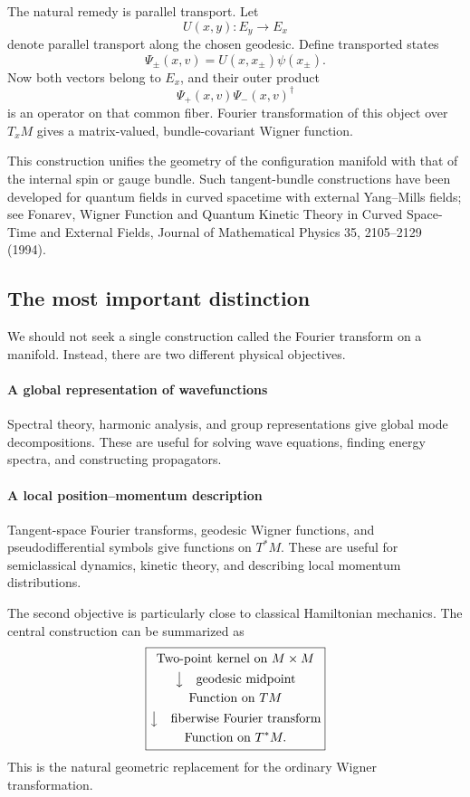 The natural remedy is parallel transport.
Let
\[
U(x,y):E_y\longrightarrow E_x
\]
denote parallel transport along the chosen geodesic.
Define transported states
\[
\Psi_\pm(x,v)=U(x,x_\pm)\psi(x_\pm).
\]
Now both vectors belong to \(E_x\), and their outer product
\[
\Psi_+(x,v)\Psi_-(x,v)^\dagger
\]
is an operator on that common fiber.
Fourier transformation of this object over \(T_xM\) gives a matrix-valued,
bundle-covariant Wigner function.

This construction unifies the geometry of the configuration manifold with that
of the internal spin or gauge bundle.
Such tangent-bundle constructions have been developed for quantum fields in
curved spacetime with external Yang–Mills fields; see Fonarev, Wigner Function
and Quantum Kinetic Theory in Curved Space-Time and External Fields, Journal of
Mathematical Physics 35, 2105–2129 (1994). 

\subsection{The most important distinction}
We should not seek a single construction called the Fourier transform on a
manifold.
Instead, there are two different physical objectives.
\paragraph{A global representation of wavefunctions}
Spectral theory, harmonic analysis, and group representations give global mode
decompositions. These are useful for solving wave equations, finding energy
spectra, and constructing propagators.

\paragraph{A local position–momentum description}
Tangent-space Fourier transforms, geodesic Wigner functions, and
pseudodifferential symbols give functions on \(T^*M\). These are useful for
semiclassical dynamics, kinetic theory, and describing local momentum
distributions.

The second objective is particularly close to classical Hamiltonian mechanics.
The central construction can be summarized as
\[
\boxed{
\begin{gathered}
\text{Two-point kernel on }M\times M\\
\big\downarrow\quad \text{geodesic midpoint}\\
\text{Function on }TM\\
\big\downarrow\quad\text{fiberwise Fourier transform}\\
\text{Function on }T^*M.
\end{gathered}
}
\]
This is the natural geometric replacement for the ordinary Wigner transformation.

